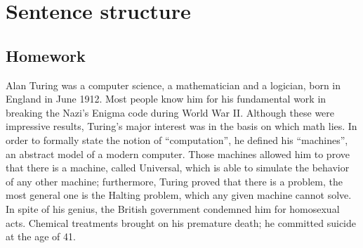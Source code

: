 
\chapter{Sentence structure}

\section{Homework}

Alan Turing was a computer science, a mathematician and a logician,
born in England in June 1912. Most people know him for his
fundamental work in breaking the Nazi's Enigma code during World War
II. Although these were impressive results, Turing's major interest was in
the basis on which math lies.  In order to formally state the notion
of ``computation'', he defined his ``machines'', an abstract model of
a modern computer. Those machines allowed him to prove that there
is a machine, called Universal, which is able to simulate the behavior of
any other machine; furthermore, Turing proved that there is a
problem, the most general one is the Halting problem, which any 
given machine cannot solve. 
In spite of his genius, the British government condemned him for
homosexual acts. Chemical treatments brought on his premature death;
he committed suicide at the age of 41.
